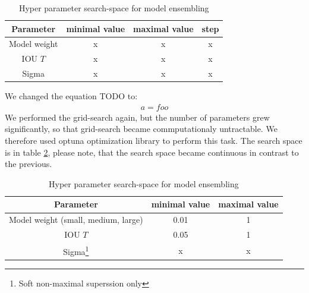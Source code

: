\begin{table}
    \centering
    \begin{tabular}{|c|c|c|c|}
        Parameter                                         & minimal value & maximal value & step \\ \hline
        Model weight                                      & x             & x             & x    \\ \hline
        IOU $T$                                           & x             & x             & x    \\ \hline
        Sigma & x             & x             & x    \\ \hline
    \end{tabular}
    \caption{Hyper parameter search-space for model ensembling}
    \label{tab:ensembling_search_space}
\end{table}

We changed the equation TODO to:
\begin{align}
    a = foo
\end{align}
We performed the grid-search again, but the number of parameters grew significantly, so that grid-search became commputationaly untractable. We therefore used optuna optimization library to perform this task. The search space is in table \ref{tab:ensembling_search_space_area}, please note, that the search space became continuous in contrast to the previous.

\begin{table}
    \centering
    \begin{tabular}{|c|c|c|}
        Parameter                                         & minimal value & maximal value \\ \hline
        Model weight (small, medium, large)               & 0.01          & 1             \\ \hline
        IOU $T$                                           & 0.05          & 1             \\ \hline
        Sigma\footnote{Soft non-maximal superssion only } & x             & x             \\ \hline
    \end{tabular}
    \caption{Hyper parameter search-space for model ensembling}
    \label{tab:ensembling_search_space_area}
\end{table}


